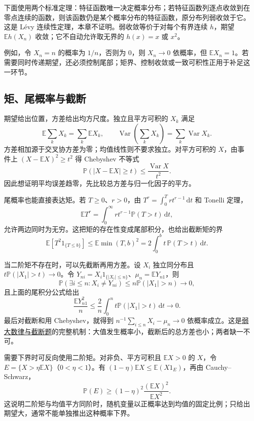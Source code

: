 下面使用两个标准定理：特征函数唯一决定概率分布；若特征函数列逐点收敛到在零点连续的函数，则该函数仍是某个概率分布的特征函数，原分布列弱收敛于它。这是 Lévy 连续性定理，本章不证明。弱收敛等价于对每个有界连续 $h$，期望 $\mathbb Eh(X_n)$ 收敛；它不自动允许取无界的 $h(x)=x$ 或 $x^2$。

例如，令 $X_n=n$ 的概率为 $1/n$，否则为 $0$，则 $X_n\to0$ 依概率，但 $\mathbb EX_n=1$。若需要同时传递期望，还必须控制尾部；矩界、控制收敛或一致可积性正用于补足这一环节。

\subsection{矩、尾概率与截断}

\label{app:probability-moments}

期望给出位置，方差给出均方尺度。独立且平方可积的 $X_k$ 满足
\[
\mathbb E\sum_kX_k=\sum_k\mathbb EX_k,
\qquad
\operatorname{Var}\!\left(\sum_kX_k\right)=\sum_k\operatorname{Var}X_k.
\]
方差相加源于交叉协方差为零；均值线性则不要求独立。对平方可积的 $X$，由事件上 $(X-\mathbb EX)^2\ge t^2$ 得 Chebyshev 不等式
\[
\mathbb P(|X-\mathbb EX|\ge t)\le\frac{\operatorname{Var}X}{t^2}.
\]
因此想证明平均误差趋零，先比较总方差与归一化因子的平方。

尾概率也能直接表达矩。若 $T\ge0$、$r>0$，由 $T^r=\int_0^Trt^{r-1}\,\mathrm dt$ 和 Tonelli 定理，
\[
\mathbb ET^r=\int_0^\infty rt^{r-1}\mathbb P(T>t)\,\mathrm dt,
\]
允许两边同时为无穷。这把矩的存在性变成尾部积分，也给出截断矩的界
\[
\mathbb E[T^2 1_{\{T\le b\}}]\le\mathbb E\min(T,b)^2
=2\int_0^bt\,\mathbb P(T>t)\,\mathrm dt.
\]

当二阶矩不存在时，可以先截断再用方差。设 $X_i$ 独立同分布且 $t\mathbb P(|X_1|>t)\to0$。令 $Y_{ni}=X_i1_{\{|X_i|\le n\}}$、$\mu_n=\mathbb EY_{n1}$，则
\[
\mathbb P(\exists i\le n:X_i\ne Y_{ni})\le n\mathbb P(|X_1|>n)\to0,
\]
且上面的尾积分公式给出
\[
\frac{\mathbb EY_{n1}^2}{n}\le\frac2n\int_0^nt\mathbb P(|X_1|>t)\,\mathrm dt\to0.
\]
最后对截断和用 Chebyshev，就得到 $n^{-1}\sum_{i\le n}X_i-\mu_n\to0$ 依概率成立。这是\hyperref[pr:fin11-high:12]{弱大数律与截断题}的完整机制：大值发生概率小，截断后的总方差也小；两者缺一不可。

需要下界时可反向使用二阶矩。对非负、平方可积且 $\mathbb EX>0$ 的 $X$，令 $E=\{X>\eta\mathbb EX\}$（$0<\eta<1$）。有 $(1-\eta)\mathbb EX\le\mathbb E(X1_E)$，再由 Cauchy--Schwarz，
\[
\mathbb P(E)\ge(1-\eta)^2\frac{(\mathbb EX)^2}{\mathbb EX^2}.
\]
这说明二阶矩与均值平方同阶时，随机变量以正概率达到均值的固定比例；只给出期望大，通常不能单独推出这种概率下界。

